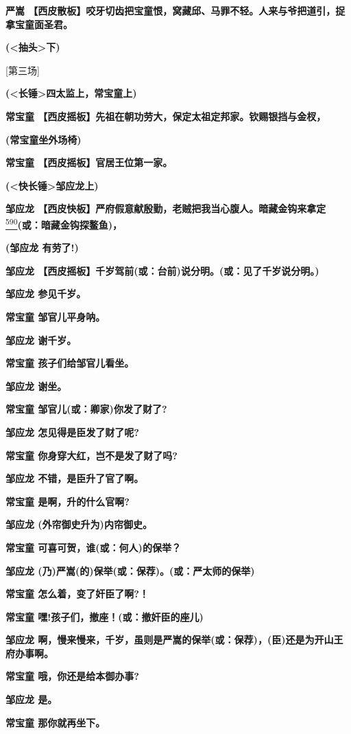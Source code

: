 \textbf{严嵩
【西皮散板】咬牙切齿把宝童恨，窝藏邱、马罪不轻。人来与爷把道引，捉拿宝童面圣君。}

\textbf{(\textless{}抽头\textgreater{}下)}

{[}第三场{]}

\textbf{(\textless{}长锤\textgreater{}四太监上，常宝童上)}

\textbf{常宝童
【西皮摇板】先祖在朝功劳大，保定太祖定邦家。钦赐银挡与金杈，}

\textbf{(常宝童坐外场椅)}

\textbf{常宝童 【西皮摇板】官居王位第一家。}

\textbf{(\textless{}快长锤\textgreater{}邹应龙上)}

\textbf{邹应龙
【西皮快板】严府假意献殷勤，老贼把我当心腹人。暗藏金钩来拿定}\protect\hyperlink{fn590}{\textsuperscript{590}}\textbf{(或：暗藏金钩探鳌鱼)，}

\textbf{(邹应龙 有劳了!)}

\textbf{邹应龙
【西皮摇板】千岁驾前(或：台前)说分明。(或：见了千岁说分明。)}

\textbf{邹应龙 参见千岁。}

\textbf{常宝童 邹官儿平身呐。}

\textbf{邹应龙 谢千岁。}

\textbf{常宝童 孩子们给邹官儿看坐。}

\textbf{邹应龙 谢坐。}

\textbf{常宝童 邹官儿(或：卿家)你发了财了?}

\textbf{邹应龙 怎见得是臣发了财了呢?}

\textbf{常宝童 你身穿大红，岂不是发了财了吗?}

\textbf{邹应龙 不错，是臣升了官了啊。}

\textbf{常宝童 是啊，升的什么官啊?}

\textbf{邹应龙 (外帘御史升为)内帘御史。}

\textbf{常宝童 可喜可贺，谁(或：何人)的保举？}

\textbf{邹应龙 (乃)严嵩(的)保举(或：保荐)。(或：严太师的保举)}

\textbf{常宝童 怎么着，变了奸臣了啊?！}

\textbf{常宝童 嘿!孩子们，撤座！(或：撤奸臣的座儿)}

\textbf{邹应龙
啊，慢来慢来，千岁，虽则是严嵩的保举(或：保荐)，(臣)还是为开山王府办事啊。}

\textbf{常宝童 哦，你还是给本御办事?}

\textbf{邹应龙 是。}

\textbf{常宝童 那你就再坐下。}

